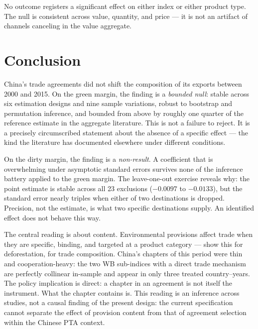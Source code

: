 \documentclass[12pt]{article}
\begin{document}
No outcome registers a significant effect on either index or either product type. The
null is consistent across value, quantity, and price --- it is not an artifact of
channels canceling in the value aggregate.


\section{Conclusion}\label{sec:conclusion}

China's trade agreements did not shift the composition of its exports between 2000 and 2015.
On the green margin, the finding is a \emph{bounded null}: stable across six estimation
designs and nine sample variations, robust to bootstrap and permutation inference, and
bounded from above by roughly one quarter of the reference estimate in the aggregate
literature. This is not a failure to reject. It is a precisely circumscribed statement
about the absence of a specific effect --- the kind the literature has documented elsewhere
under different conditions.

On the dirty margin, the finding is a \emph{non-result}. A coefficient that is overwhelming
under asymptotic standard errors survives none of the inference battery applied to the green
margin. The leave-one-out exercise reveals why: the point estimate is stable across all 23
exclusions ($-0.0097$ to $-0.0133$), but the standard error nearly triples when either of
two destinations is dropped. Precision, not the estimate, is what two specific destinations
supply. An identified effect does not behave this way.

The central reading is about content. Environmental provisions affect trade when they are
specific, binding, and targeted at a product category --- \citet{abman2024} show this for
deforestation, \citet{brandi2020} for trade composition. China's chapters of this period
were thin and cooperation-heavy: the two WB sub-indices with a direct trade mechanism are
perfectly collinear in-sample and appear in only three treated country--years. The policy
implication is direct: a chapter in an agreement is not itself the instrument. What the
chapter contains is. This reading is an inference across studies, not a causal finding of
the present design: the current specification cannot separate the effect of provision
content from that of agreement selection within the Chinese PTA context.
\end{document}
